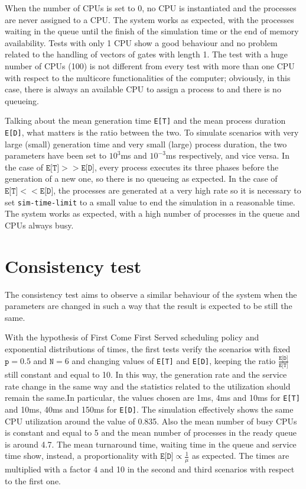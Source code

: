 When the number of CPUs is set to 0, no CPU is instantiated and the processes
are never assigned to a CPU. The system works as expected, with the processes
waiting in the queue until the finish of the simulation time or the end of
memory availability. Tests with only 1 CPU show a good behaviour and no problem
related to the handling of vectors of gates with length 1. The test with
a huge number of CPUs (100) is not different from every test with more than 
one CPU with respect to the multicore functionalities of the computer; obviously,
in this case, there is always an available CPU to assign a process to and 
there is no queueing.

Talking about the mean generation time \texttt{E[T]} and the mean process duration 
\texttt{E[D]}, what matters is the ratio between the two. To simulate scenarios
with very large (small) generation time and very small (large) process duration, the two
parameters have been set to $10^3$ms and $10^{-3}$ms respectively, and vice versa.
In the case of $\texttt{E[T]}>>\texttt{E[D]}$, every process executes its three phases 
before the generation of a new one, so there is no queueing as expected.
In the case of $\texttt{E[T]}<<\texttt{E[D]}$, the processes are generated at a very high rate
so it is necessary to set \texttt{sim-time-limit} to a small value to 
end the simulation in a reasonable time. The system works as expected, with
a high number of processes in the queue and CPUs always busy.

\section{Consistency test}
The consistency test aims to observe a similar behaviour of the system when the
parameters are changed in such a way that the result is expected to be still the same.

With the hypothesis of First Come First Served scheduling policy and 
exponential distributions of times, the first tests verify the scenarios 
with fixed $\texttt{p}=0.5$ and $\texttt{N}=6$ and changing values of \texttt{E[T]} and \texttt{E[D]}, 
keeping the ratio $\frac{\texttt{E[D]}}{\texttt{E[T]}}$ still constant and equal to 10. In this way, the generation
rate and the service rate change in the same way and the statistics related to
the utilization should remain the same.In particular, the values chosen are 1ms, 
4ms and 10ms for \texttt{E[T]} and 10ms, 40ms and 150ms for \texttt{E[D]}. 
The simulation effectively shows the same CPU utilization around the value of
0.835. Also the mean number of busy CPUs is constant and equal to 5 and the mean
number of processes in the ready queue is around 4.7. The mean turnaround time, 
waiting time in the queue and service time show, instead, a proportionality
with $\texttt{E[D]}\propto \frac{1}{\mu}$ as expected. The times are multiplied 
with a factor 4 and 10 in the second and third scenarios with respect to the first one.

